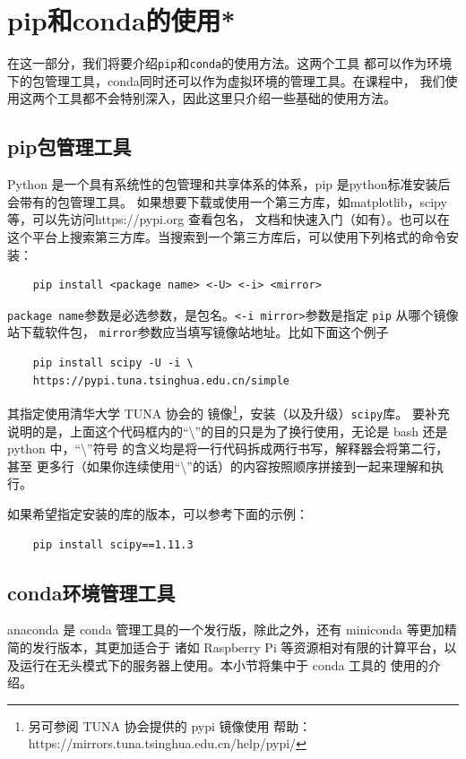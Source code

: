 \section{pip和conda的使用*}
在这一部分，我们将要介绍\texttt{pip}和\texttt{conda}的使用方法。这两个工具
都可以作为环境下的包管理工具，conda同时还可以作为虚拟环境的管理工具。在课程中，
我们使用这两个工具都不会特别深入，因此这里只介绍一些基础的使用方法。

\subsection{pip包管理工具}
Python 是一个具有系统性的包管理和共享体系的体系，pip 是python标准安装后会带有的包管理工具。
如果想要下载或使用一个第三方库，如matplotlib，scipy等，可以先访问https://pypi.org 查看包名，
文档和快速入门（如有）。也可以在这个平台上搜索第三方库。当搜索到一个第三方库后，可以使用下列格式的命令安装：
\lstset{language=bash}
\begin{lstlisting}
    pip install <package name> <-U> <-i> <mirror>
\end{lstlisting}
\texttt{package name}参数是必选参数，是包名。\texttt{<-i mirror>}参数是指定 \texttt{pip} 从哪个镜像站下载软件包，
\texttt{mirror}参数应当填写镜像站地址。比如下面这个例子
\begin{lstlisting}
    pip install scipy -U -i \
    https://pypi.tuna.tsinghua.edu.cn/simple
\end{lstlisting}
其指定使用清华大学 TUNA 协会的
镜像\footnote{另可参阅 TUNA 协会提供的 pypi 镜像使用
帮助：\\https://mirrors.tuna.tsinghua.edu.cn/help/pypi/}，安装（以及升级）\texttt{scipy}库。
要补充说明的是，上面这个代码框内的“\textbackslash ”的目的只是为了换行使用，无论是 bash 还是 python 中，“\textbackslash ”符号
的含义均是将一行代码拆成两行书写，解释器会将第二行，甚至
更多行（如果你连续使用“\textbackslash ”的话）的内容按照顺序拼接到一起来理解和执行。

如果希望指定安装的库的版本，可以参考下面的示例：
\begin{lstlisting}
    pip install scipy==1.11.3
\end{lstlisting}
\subsection{conda环境管理工具}
anaconda 是 conda 管理工具的一个发行版，除此之外，还有 miniconda 等更加精简的发行版本，其更加适合于
诸如 Raspberry Pi 等资源相对有限的计算平台，以及运行在无头模式下的服务器上使用。本小节将集中于 conda 工具的
使用的介绍。

